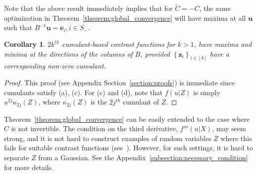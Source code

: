 \documentclass[letterpaper]{article}
\newtheorem{remark}{Remark}
\newtheorem{corollary}{Corollary}[theorem]
\newcommand{\bu}{\pmb{u}}
\newcommand{\be}{\pmb{e}}
\newcommand{\bz}{\pmb{z}}
\newcommand{\bb}[1]{\left(#1\right)}
\begin{document}
Note that the above result immediately implies that for $\tilde{C}=-C$, the same optimization in Theorem~\ref{theorem:global_convergence}
will have maxima at all $\bu$ such that $B^{-1}\bu=\be_i,i\in S_-$.
\begin{corollary}
    $2k^{th}$ cumulant-based contrast functions for $k>1$, have maxima and minima at the directions of the columns of $B$, provided $\left\{\bz_{i}\right\}_{i \in [k]}$ have a corresponding non-zero cumulant.
\end{corollary}
\vspace{-10pt}
\begin{proof}
This proof (see Appendix Section~\ref{section:proofs})  is immediate since cumulants satisfy (a), (c). For (c) and (d), note that $f(u|Z)$ is simply $u^{2j}\kappa_{2j}(Z)$, where $\kappa_{2j}(Z)$ is the $2j^{th}$ cumulant of $Z$.
\end{proof}
Theorem~\ref{theorem:global_convergence} can be easily extended to the case where $C$ is not invertible. The condition on the third derivative, $f'''\bb{u|X}$, may seem strong, and it is not hard to construct examples of random variables $Z$ where this fails for suitable contrast functions (see~\cite{doi:10.1080/00031305.1994.10476058}). However, for such settings, it is hard to separate $Z$ from a Gaussian. See the Appendix~\ref{subsection:necessary_condition} for more details.
\end{document}

